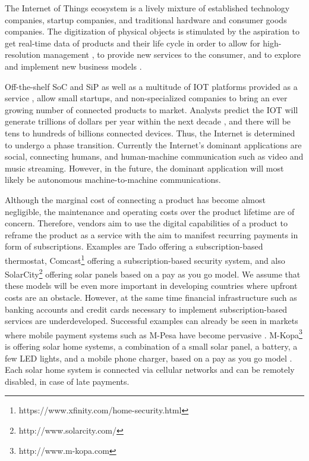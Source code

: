 The Internet of Things ecosystem is a lively mixture of established technology companies, startup companies, and traditional hardware and consumer goods companies. The digitization of physical objects is stimulated by the aspiration to get real-time data of products and their life cycle in order to allow for high-resolution management \parencite{fleisch2010internet}, to provide new services to the consumer, and to explore and implement new business models \parencite{Fleisch2015}.	

Off-the-shelf \ac{SoC} and \ac{SiP} as well as a multitude of \ac{IOT} platforms provided as a service \parencite{ISI:000379632700002}, allow small startups, and non-specialized companies to bring an ever growing number of connected products to market. Analysts predict the \ac{IOT} will generate trillions of dollars per year within the next decade \parencite{manyika2015unlocking}, and there will be tens to hundreds of billions connected devices. Thus, the Internet is determined to undergo a phase transition. Currently the Internet's dominant applications are social, connecting humans, and human-machine communication such as video and music streaming. However, in the future, the dominant application will most likely be autonomous machine-to-machine communications. 

Although the marginal cost of connecting a product has become almost negligible, the maintenance and operating costs over the product lifetime are of concern. Therefore, vendors aim to use the digital capabilities of a product to reframe the product as a service with the aim to manifest recurring payments in form of subscriptions. Examples are Tado offering a subscription-based thermostat, Comcast\footnote{https://www.xfinity.com/home-security.html} offering a subscription-based security system, and also SolarCity\footnote{http://www.solarcity.com/} offering solar panels based on a pay as you go model. We assume that these models will be even more important in developing countries where upfront costs are an obstacle. However, at the same time financial infrastructure such as banking accounts and credit cards necessary to implement subscription-based services are underdeveloped. Successful examples can already be seen in markets where mobile payment systems such as M-Pesa have become pervasive \parencite{hughes2007m}. M-Kopa\footnote{http://www.m-kopa.com} is offering solar home systems, a combination of a small solar panel, a battery, a few LED lights, and a mobile phone charger, based on a pay as you go model \parencite{ISI:000351842100012}. Each solar home system is connected via cellular networks and can be remotely disabled, in case of late payments. 

